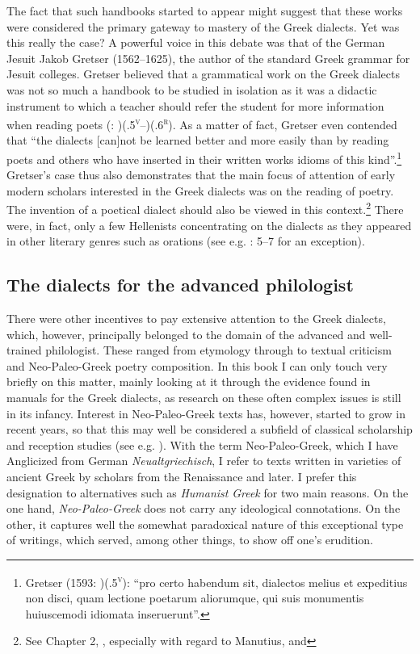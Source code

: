 The fact that such handbooks started to appear might suggest that these works were considered the primary gateway to mastery of the Greek dialects. Yet was this really the case? A powerful voice in this debate was that of the German Jesuit Jakob Gretser (1562–1625), the author of the standard Greek grammar for Jesuit colleges. Gretser believed that a grammatical work on the Greek dialects was not so much a handbook to be studied in isolation as it was a didactic instrument to which a teacher should refer the student for more information when reading poets (\citealt{Gretser1593}: )(.5\textsc{\textsuperscript{v}}–)(.6\textsc{\textsuperscript{r}}). As a matter of fact, Gretser even contended that “the dialects [can]not be learned better and more easily than by reading poets and others who have inserted in their written works idioms of this kind”.\footnote{Gretser (1593: )(.5\textsc{\textsuperscript{v}}): “pro certo habendum sit, dialectos melius et expeditius non disci, quam lectione poetarum aliorumque, qui suis monumentis huiuscemodi idiomata inseruerunt”.} Gretser’s case thus also demonstrates that the main focus of attention of early modern scholars interested in the Greek dialects was on the reading of poetry. The invention of a poetical dialect should also be viewed in this context.\footnote{See Chapter 2, , especially with regard to Manutius, and } There were, in fact, only a few Hellenists concentrating on the dialects as they appeared in other literary genres such as orations (see e.g. \citealt{Labbe1639}: 5–7 for an exception).

\subsection{The dialects for the advanced philologist}
\hypertarget{Toc19704820}{}
There were other incentives to pay extensive attention to the Greek dialects, which, however, principally belonged to the domain of the advanced and well-trained philologist. These ranged from etymology through to textual criticism and Neo-Paleo-Greek poetry composition. In this book I can only touch very briefly on this matter, mainly looking at it through the evidence found in manuals for the Greek dialects, as research on these often complex issues is still in its infancy. Interest in Neo-Paleo-Greek texts has, however, started to grow in recent years, so that this may well be considered a subfield of classical scholarship and reception studies (see e.g. \citealt{PällVolt2018}). With the term Neo-Paleo-Greek, which I have Anglicized from German \textit{Neualtgriechisch}, I refer to texts written in varieties of ancient Greek by scholars from the Renaissance and later. I prefer this designation to alternatives such as \textit{Humanist} \textit{Greek} for two main reasons. On the one hand, \textit{Neo-Paleo-Greek} does not carry any ideological connotations. On the other, it captures well the somewhat paradoxical nature of this exceptional type of writings, which served, among other things, to show off one’s erudition.


